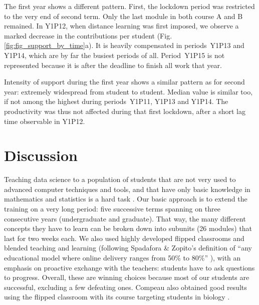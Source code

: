 \documentclass{aims}
\theoremstyle{definition}
\begin{document}
The first year shows a different pattern. First, the lockdown period was
restricted to the very end of second term. Only the last module in both
course A and B remained. In Y1P12, when distance learning was first
imposed, we observe a marked decrease in the contributions per student
(Fig. \ref {fig:fig_support_by_time}a). It is heavily compensated in
periods~Y1P13 and Y1P14, which are by far the busiest periods of all.
Period~Y1P15 is not represented because it is after the deadline to
finish all work that year.

Intensity of support during the first year shows a similar pattern as
for second year: extremely widespread from student to student. Median
value is similar too, if not among the highest during periods~Y1P11,
Y1P13 and Y1P14. The productivity was thus not affected during that
first lockdown, after a short lag time observable in Y1P12.

\hypertarget{discussion}{%
\section{Discussion}\label{discussion}}

Teaching data science to a population of students that are not very used
to advanced computer techniques and tools, and that have only basic
knowledge in mathematics and statistics is a hard task \cite{Sousa2018}.
Our basic approach is to extend the training on a very long period: five
successive terms spanning on three consecutive years (undergraduate and
graduate). That way, the many different concepts they have to learn can
be broken down into subunits (26 modules) that last for two weeks each.
We also used highly developed flipped classrooms and blended teaching
and learning (following Spadafora \& Zopito's definition of ``any
educational model where online delivery ranges from 50\% to 80\%''
\cite{Spadafora2018}), with an emphasis on proactive exchange with the
teachers: students have to ask questions to progress. Overall, these are
winning choices because most of our students are successful, excluding a
few defeating ones. Compeau also obtained good results using the flipped
classroom with its course targeting students in biology
\cite{Compeau2019}.
\end{document}
